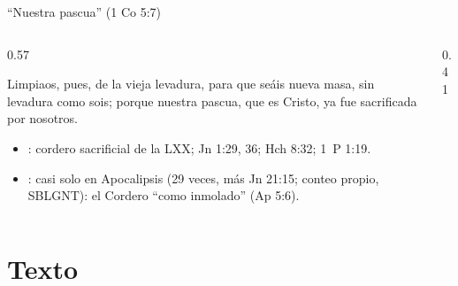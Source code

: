 \begin{frame}{``Nuestra pascua'' (1 Co 5:7)}
\begin{columns}[c,onlytextwidth]
\begin{column}{0.57\textwidth}
\begin{cita}Limpiaos, pues, de la vieja levadura, para que seáis nueva masa, sin levadura como sois; porque nuestra pascua, que es Cristo, ya fue sacrificada por nosotros.\end{cita}
\scriptsize\RaggedRight
\begin{itemize}\scriptsize
\item {}: cordero sacrificial de la LXX; Jn 1:29, 36; Hch 8:32; 1~P 1:19.
\item {}: casi solo en Apocalipsis (29 veces, más Jn 21:15; conteo propio, SBLGNT): el Cordero ``como inmolado'' (Ap 5:6).
\end{itemize}
\end{column}
\begin{column}{0.41\textwidth}\end{column}
\end{columns}
\end{frame}

\section{Texto}

